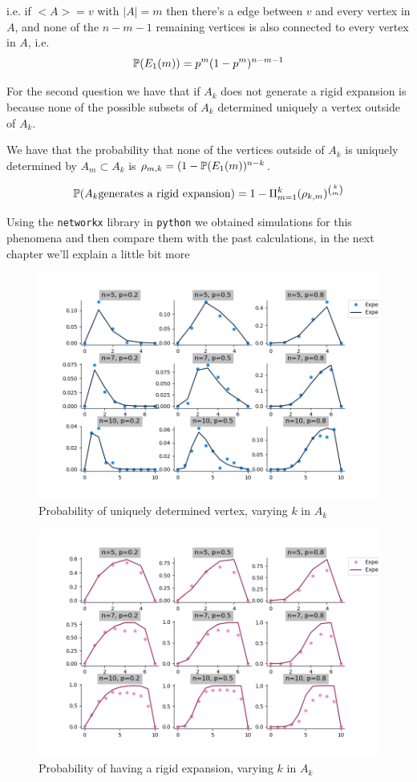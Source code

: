 i.e. if $<A> = v$ with $|A| = m$ then there's a edge between $v$ and every vertex in $A$, and none of the $n-m-1$ remaining vertices is also connected to every vertex in $A$, i.e.
$$\P(E_1(m)) = p^{m}(1-p^{m})^{n-m-1}$$

For the second question we have that if $A_k$ does not generate a rigid expansion is because none of the possible subsets of $A_k$ determined uniquely a vertex outside of $A_k$. 

We have that the probability that none of the vertices outside of $A_k$ is uniquely determined by $A_m\subset A_k$ is $\rho_{m,k} = (1 -  \P(E_1(m) )^{n-k}$.

$$\P(A_k \text{generates a rigid expansion}) = 1 -  \Pi_{m=1}^{k} (\rho_{k,m})^{\binom{k}{m}}  $$

Using the \texttt{networkx} library in \texttt{python} we obtained simulations for this phenomena and then compare them with the past calculations, in the next chapter we'll explain a little bit more

\begin{figure}[h!]
	\centering
	\includegraphics[scale=0.5]{Python/Figures/Uniquely-determinated-fixed-vertex.png}
	\caption{Probability of uniquely determined vertex, varying $k$ in $A_k$}
\end{figure}

\begin{figure}[h!]
	\centering
	\includegraphics[scale=0.5]{Python/Figures/Expansion-probability.png}
	\caption{Probability of having a rigid expansion,  varying $k$ in $A_k$}
\end{figure}

